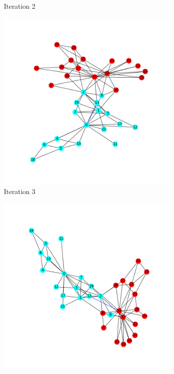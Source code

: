 \documentclass[11pt]{article} %
\begin{document}
\begin{figure}[h!]
\begin{subfigure}[b]{0.4\linewidth}
    \caption{Iteration 2}
  \end{subfigure}
  \begin{subfigure}[b]{0.4\linewidth}
    \includegraphics[width=\linewidth]{../Figures/Iteration3.png}
    \caption{Iteration 3}
  \end{subfigure}
  \begin{subfigure}[b]{0.4\linewidth}
    \includegraphics[width=\linewidth]{../Figures/Iteration4.png}

\end{subfigure}
\end{figure}
\end{document}
